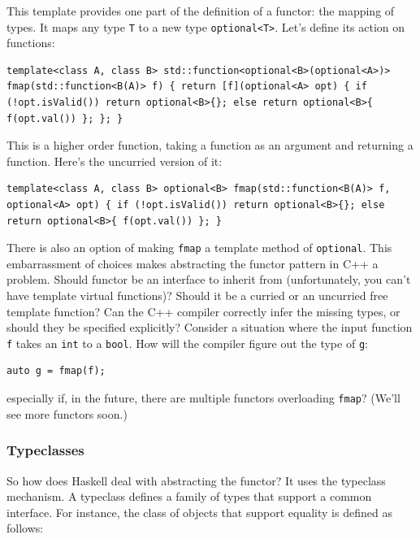 This template provides one part of the definition of a functor: the
mapping of types. It maps any type \texttt{T} to a new type
\texttt{optional\textless{}T\textgreater{}}. Let's define its action on
functions:

\begin{verbatim}
template<class A, class B> std::function<optional<B>(optional<A>)> fmap(std::function<B(A)> f) { return [f](optional<A> opt) { if (!opt.isValid()) return optional<B>{}; else return optional<B>{ f(opt.val()) }; }; }
\end{verbatim}

This is a higher order function, taking a function as an argument and
returning a function. Here's the uncurried version of it:

\begin{verbatim}
template<class A, class B> optional<B> fmap(std::function<B(A)> f, optional<A> opt) { if (!opt.isValid()) return optional<B>{}; else return optional<B>{ f(opt.val()) }; }
\end{verbatim}

There is also an option of making \texttt{fmap} a template method of
\texttt{optional}. This embarrassment of choices makes abstracting the
functor pattern in C++ a problem. Should functor be an interface to
inherit from (unfortunately, you can't have template virtual functions)?
Should it be a curried or an uncurried free template function? Can the
C++ compiler correctly infer the missing types, or should they be
specified explicitly? Consider a situation where the input function
\texttt{f} takes an \texttt{int} to a \texttt{bool}. How will the
compiler figure out the type of \texttt{g}:

\begin{verbatim}
auto g = fmap(f);
\end{verbatim}

especially if, in the future, there are multiple functors overloading
\texttt{fmap}? (We'll see more functors soon.)

\subsubsection{Typeclasses}\label{typeclasses}

So how does Haskell deal with abstracting the functor? It uses the
typeclass mechanism. A typeclass defines a family of types that support
a common interface. For instance, the class of objects that support
equality is defined as follows:

